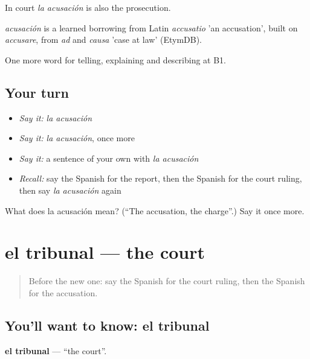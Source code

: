 In court \emph{la acusación} is also the prosecution.

\begin{cousinweb}
\emph{acusación} is a learned borrowing from Latin \emph{accusatio} 'an accusation', built on \emph{accusare}, from \emph{ad} and \emph{causa} 'case at law' (EtymDB).
\end{cousinweb}

\begin{grammarlens}[title={What you've built}]
One more word for telling, explaining and describing at B1.
\end{grammarlens}

\subsection*{Your turn}
\begin{itemize}
\raggedright
  \item \emph{Say it:} \emph{la acusación}
  \item \emph{Say it:} \emph{la acusación}, once more
  \item \emph{Say it:} a sentence of your own with \emph{la acusación}
  \item \emph{Recall:} say the Spanish for the report, then the Spanish for the court ruling, then say \emph{la acusación} again
\end{itemize}

\begin{tcolorbox}[breakable,colback=teal!4,colframe=teal!35!black,title={Before you move on}]
What does la acusación mean? (\textquotedblleft{}The accusation, the charge\textquotedblright{}.) Say it once more.
\end{tcolorbox}
\section[el tribunal]{el tribunal — the court}

\label{lesson:ES-C626-tribunal}



\begin{quote}
Before the new one: say the Spanish for the court ruling, then the Spanish for the accusation.
\end{quote}

\subsection*{You'll want to know: el tribunal}
\textbf{el tribunal} — \textquotedblleft{}the court\textquotedblright{}.

